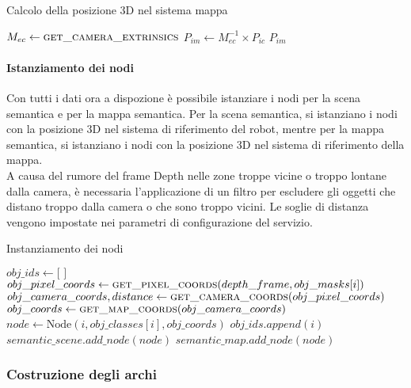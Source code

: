 \begin{algorithm}
	\caption{Calcolo della posizione 3D nel sistema mappa}
	\begin{algorithmic}[1]
		\State $M_{ec} \gets \Call{get\_camera\_extrinsics}{}$ 
		\State $P_{im} \gets M_{ec}^{-1} \times P_{ic}$
		\State \Return $P_{im}$
		\EndProcedure
	\end{algorithmic}
\end{algorithm}

\paragraph{Istanziamento dei nodi}
Con tutti i dati ora a dispozione è possibile istanziare i nodi per la scena semantica e per la mappa semantica. Per la scena semantica, si istanziano i nodi con la posizione 3D nel sistema di riferimento del robot, mentre per la mappa semantica, si istanziano i nodi con la posizione 3D nel sistema di riferimento della mappa. \\
A causa del rumore del frame Depth nelle zone troppe vicine o troppo lontane dalla camera, è necessaria l'applicazione di un filtro per escludere gli oggetti che distano troppo dalla camera o che sono troppo vicini. Le soglie di distanza vengono impostate nei parametri di configurazione del servizio.

\begin{algorithm}
	\caption{Instanziamento dei nodi}
	\begin{algorithmic}[1]
		\State $obj\_ids \gets \text{[ ]}$
		\State $obj\_pixel\_coords \gets \Call{get\_pixel\_coords}{depth\_frame, obj\_masks[i]}$
		\State $obj\_camera\_coords, distance \gets \Call{get\_camera\_coords}{obj\_pixel\_coords}$
		\State $obj\_coords \gets \Call{get\_map\_coords}{obj\_camera\_coords}$
		\State $node \gets \text{Node}(i, obj\_classes[i], obj\_coords)$
		\State $obj\_ids.append(i)$
		\State $semantic\_scene.add\_node(node)$
		\State $semantic\_map.add\_node(node)$
		\EndIf
		\EndFor
	\end{algorithmic}
\end{algorithm}

\subsubsection{Costruzione degli archi}

